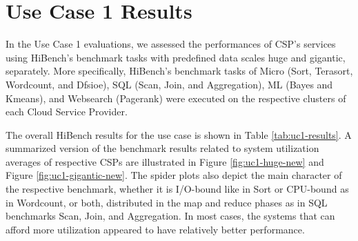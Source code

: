 \documentclass[review]{elsarticle}
\begin{document}

\section{Use Case 1 Results}

In the Use Case 1 evaluations, we assessed the performances of CSP's services using HiBench's benchmark tasks with predefined data scales huge and gigantic, separately. More specifically, HiBench's benchmark tasks of Micro (Sort, Terasort, Wordcount, and Dfsioe), SQL (Scan, Join, and Aggregation), ML (Bayes and Kmeans), and Websearch (Pagerank) were executed on the respective clusters of each Cloud Service Provider. 

The overall HiBench results for the use case is shown in Table \ref{tab:uc1-results}. A summarized version of the benchmark results related to system utilization averages of respective CSPs are illustrated in Figure \ref{fig:uc1-huge-new} and Figure  \ref{fig:uc1-gigantic-new}. The spider plots also depict the main character of the respective benchmark, whether it is I/O-bound like in Sort or CPU-bound as in Wordcount, or both, distributed in the map and reduce phases as in SQL benchmarks Scan, Join, and Aggregation. In most cases, the systems that can afford more utilization appeared to have relatively better performance.
\end{document}
